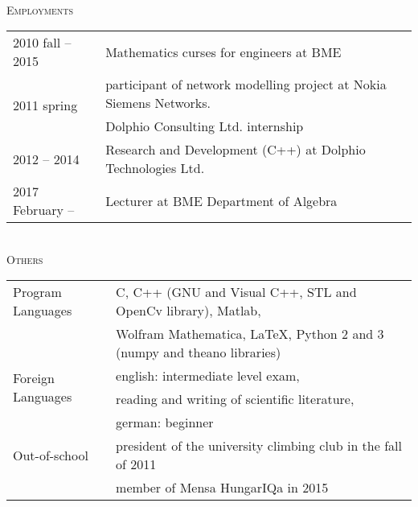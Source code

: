 \documentclass[12pt]{article}
\begin{document}
 \newpage
 { \ } \\
 \textsc{Employments}
 \vspace{0.3cm}
 \\
       \begin{tabular}{p{3.5cm}l}
	       2010 fall -- 2015 & Mathematics curses for engineers at BME\\
           \multirow{2}{*}[8pt]{2011 spring}  & participant of network modelling project at Nokia Siemens Networks. \\
		   2011 summer    & Dolphio Consulting Ltd. internship\\
		   2012 -- 2014 & Research and Development (C++) at Dolphio Technologies Ltd. \\
           2017 February -- & Lecturer at BME Department of Algebra
       \end{tabular}
 \vspace{0.3cm}
 \\
 \textsc{Others}
 \vspace{0.3cm}
 \\
        \begin{tabular}{p{3.5cm}l}
	       Program Languages &  C, C++ (GNU and Visual C++, STL and OpenCv library), Matlab, \\
                             & Wolfram Mathematica, \LaTeX, Python 2 and 3 (numpy and theano libraries)\\
           \multirow{2}{*}[8pt]{Foreign Languages} & english: intermediate level exam,\\
            &reading and writing of scientific literature, \\
            & german: beginner\\
		   Out-of-school & president of the university climbing club in the fall of 2011\\
		    & member of Mensa HungarIQa in 2015
       \end{tabular}
\end{document}
